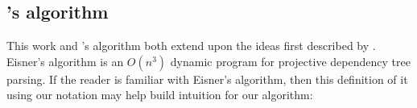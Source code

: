 \subsection{\textcite{eisner:1996}'s algorithm}

This work and \textcite{ec}'s algorithm both extend upon the ideas first described by \textcite{eisner:1996}.
Eisner's algorithm is an $O(n^3)$ dynamic program for projective dependency tree parsing.
If the reader is familiar with Eisner's algorithm, then this definition of it using our notation may help build intuition for our algorithm:

\begin{figure}[H]
\zerodisplayskips
\begin{subfigure}[t]{0.41\linewidth}
  \begin{minipage}[c]{0.25\linewidth}
  \end{minipage}


\end{subfigure}
\end{figure}
